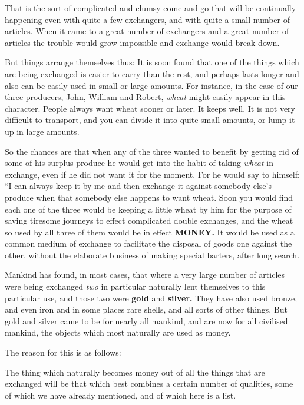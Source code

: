 \documentclass{book}
\begin{document}
That is the sort of complicated and clumsy come-and-go that will be continually happening even with quite a few exchangers, and with quite a small number of articles. When it came to a great number of exchangers and a great number of articles the trouble would grow impossible and exchange would break down.

But things arrange themselves thus: It is soon found that one of the things which are being exchanged is easier to carry than the rest, and perhaps lasts longer and also can be easily used in small or large amounts. For instance, in the case of our three producers, John, William and Robert, \emph{wheat} might easily appear in this character. People always want wheat sooner or later. It keeps well. It is not very difficult to transport, and you can divide it into quite small amounts, or lump it up in large amounts.

So the chances are that when any of the three wanted to benefit by getting rid of some of his surplus produce he would get into the habit of taking \emph{wheat} in exchange, even if he did not want it for the moment. For he would say to himself: “I can always keep it by me and then exchange it against somebody else’s produce when that somebody else happens to want wheat. Soon you would find each one of the three would be keeping a little wheat by him for the purpose of saving tiresome journeys to effect complicated double exchanges, and the wheat so used by all three of them would be in effect \textbf{MONEY.} It would be used as a common medium of exchange to facilitate the disposal of goods one against the other, without the elaborate business of making special barters, after long search.

Mankind has found, in most cases, that where a very large number of articles were being exchanged \emph{two} in particular naturally lent themselves to this particular use, and those two were \textbf{gold} and \textbf{silver.} They have also used bronze, and even iron and in some places rare shells, and all sorts of other things. But gold and silver came to be for nearly all mankind, and are now for all civilised mankind, the objects which most naturally are used as money.

The reason for this is as follows:

The thing which naturally becomes money out of all the things that are exchanged will be that which best combines a certain number of qualities, some of which we have already mentioned, and of which here is a list.
\end{document}
